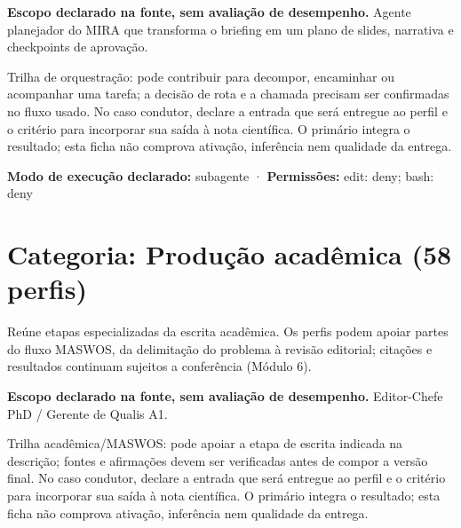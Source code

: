 
\begin{descricao}
\textbf{Escopo declarado na fonte, sem avaliação de desempenho.}
Agente planejador do MIRA que transforma o briefing em um plano de slides, narrativa e checkpoints de aprovação.
\end{descricao}

\begin{funcao}
Trilha de orquestração: pode contribuir para decompor, encaminhar ou acompanhar uma tarefa; a decisão de rota e a chamada precisam ser confirmadas no fluxo usado. No caso condutor, declare a entrada que será entregue ao perfil e o critério para incorporar sua saída à nota científica. O primário integra o resultado; esta ficha não comprova ativação, inferência nem qualidade da entrega.
\end{funcao}

\begin{arquitetura}
\textbf{Modo de execução declarado:} subagente · \textbf{Permissões:} edit: deny; bash: deny
\end{arquitetura}

\clearpage
\section{Categoria: Produção acadêmica (58 perfis)}

\begin{descricao}
Reúne etapas especializadas da escrita acadêmica. Os perfis podem apoiar partes do fluxo MASWOS, da delimitação do problema à revisão editorial; citações e resultados continuam sujeitos a conferência (Módulo 6).
\end{descricao}


\begin{descricao}
\textbf{Escopo declarado na fonte, sem avaliação de desempenho.}
Editor-Chefe PhD / Gerente de Qualis A1.
\end{descricao}

\begin{funcao}
Trilha acadêmica/MASWOS: pode apoiar a etapa de escrita indicada na descrição; fontes e afirmações devem ser verificadas antes de compor a versão final. No caso condutor, declare a entrada que será entregue ao perfil e o critério para incorporar sua saída à nota científica. O primário integra o resultado; esta ficha não comprova ativação, inferência nem qualidade da entrega.
\end{funcao}

